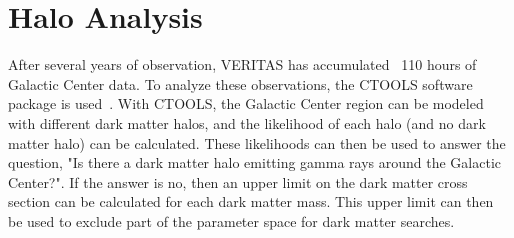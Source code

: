 \section{Halo Analysis}
  After several years of observation, VERITAS has accumulated ~110 hours of Galactic Center data.
  To analyze these observations, the CTOOLS software package is used~\cite{gammalibctools}.
  With CTOOLS, the Galactic Center region can be modeled with different dark matter halos, and the likelihood of each halo (and no dark matter halo) can be calculated.
  These likelihoods can then be used to answer the question, "Is there a dark matter halo emitting gamma rays around the Galactic Center?".
  If the answer is no, then an upper limit on the dark matter cross section can be calculated for each dark matter mass.
  This upper limit can then be used to exclude part of the parameter space for dark matter searches.


